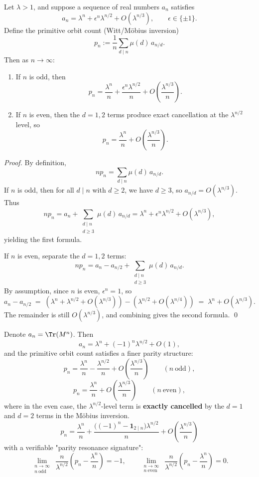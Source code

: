 \begin{proposition}\label{prop:finite-rh-parity-general}
Let \(\lambda>1\), and suppose a sequence of real numbers \(a_n\) satisfies
\[
a_n=\lambda^n+\epsilon^n\lambda^{n/2}+O(\lambda^{n/3}),
\qquad \epsilon\in\{\pm 1\}.
\]
Define the primitive orbit count (Witt/M\"obius inversion)
\[
p_n:=\frac{1}{n}\sum_{d\mid n}\mu(d)\,a_{n/d}.
\]
Then as \(n\to\infty\):
\begin{enumerate}
  \item If \(n\) is odd, then
  \[
  p_n=\frac{\lambda^n}{n}+\frac{\epsilon^n\lambda^{n/2}}{n}+O\!\left(\frac{\lambda^{n/3}}{n}\right).
  \]
  \item If \(n\) is even, then the \(d=1,2\) terms produce exact cancellation at the \(\lambda^{n/2}\) level, so
  \[
  p_n=\frac{\lambda^n}{n}+O\!\left(\frac{\lambda^{n/3}}{n}\right).
  \]
\end{enumerate}
\end{proposition}
\begin{proof}
By definition,
\[
np_n=\sum_{d\mid n}\mu(d)\,a_{n/d}.
\]
If \(n\) is odd, then for all \(d\mid n\) with \(d\ge 2\), we have \(d\ge 3\), so
\(
a_{n/d}=O(\lambda^{n/3})
\).
Thus
\[
np_n=a_n+\sum_{\substack{d\mid n\\ d\ge 3}}\mu(d)\,a_{n/d}
=\lambda^n+\epsilon^n\lambda^{n/2}+O(\lambda^{n/3}),
\]
yielding the first formula.
\par
If \(n\) is even, separate the \(d=1,2\) terms:
\[
np_n=a_n-a_{n/2}+\sum_{\substack{d\mid n\\ d\ge 3}}\mu(d)\,a_{n/d}.
\]
By assumption, since \(n\) is even, \(\epsilon^n=1\), so
\[
a_n-a_{n/2}
\;=\;
(\lambda^n+\lambda^{n/2}+O(\lambda^{n/3}))-(\lambda^{n/2}+O(\lambda^{n/4}))
\;=\;
\lambda^n+O(\lambda^{n/3}).
\]
The remainder is still \(O(\lambda^{n/3})\), and combining gives the second formula. \qed
\end{proof}

\begin{corollary}\label{cor:finite-rh-explicit-formula}
Denote $a_n=\Tr(M^n)$. Then
\[
a_n=\lambda^n+(-1)^n\lambda^{n/2}+O(1),
\]
and the primitive orbit count satisfies a finer parity structure:
\[
p_n=\frac{\lambda^n}{n}-\frac{\lambda^{n/2}}{n}+O\!\left(\frac{\lambda^{n/3}}{n}\right)\qquad(n\ \text{odd}),
\]
\[
p_n=\frac{\lambda^n}{n}+O\!\left(\frac{\lambda^{n/3}}{n}\right)\qquad(n\ \text{even}),
\]
where in the even case, the $\lambda^{n/2}$-level term is \textbf{exactly cancelled} by the $d=1$ and $d=2$ terms in the M\"obius inversion.
\[
\boxed{
\;p_n=\frac{\lambda^n}{n}+\frac{\bigl((-1)^n-\mathbf{1}_{2\mid n}\bigr)\lambda^{n/2}}{n}
+O\!\left(\frac{\lambda^{n/3}}{n}\right)\; }
\]
with a verifiable "parity resonance signature":
\[
\lim_{\substack{n\to\infty\\ n\ \mathrm{odd}}}\ \frac{n}{\lambda^{n/2}}\left(p_n-\frac{\lambda^n}{n}\right)=-1,
\qquad
\lim_{\substack{n\to\infty\\ n\ \mathrm{even}}}\ \frac{n}{\lambda^{n/2}}\left(p_n-\frac{\lambda^n}{n}\right)=0.
\]
\end{corollary}

